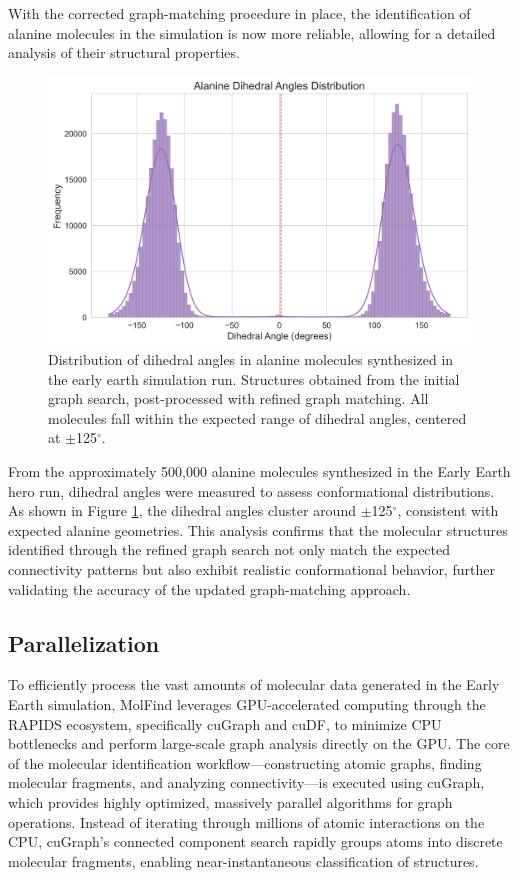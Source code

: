 With the corrected graph-matching procedure in place, the identification of alanine molecules in the simulation is now more reliable, allowing for a detailed analysis of their structural properties. 

\begin{figure}[!ht]
    \centering
    \includegraphics[width=1\linewidth]{Images/alanine_dihedral/dihedral_angles_distribution.png}
    \caption[Distribution of synthesized alanine dihedral angles]{Distribution of dihedral angles in alanine molecules synthesized in the early earth simulation run. Structures obtained from the initial graph search, post-processed with refined graph matching. All molecules fall within the expected range of dihedral angles, centered at $\pm$125$^\circ$.}
    \label{fig:ala_dihedral}
\end{figure}

From the approximately 500,000 alanine molecules synthesized in the Early Earth hero run, dihedral angles were measured to assess conformational distributions. As shown in Figure \ref{fig:ala_dihedral}, the dihedral angles cluster around $\pm$125$^\circ$, consistent with expected alanine geometries. This analysis confirms that the molecular structures identified through the refined graph search not only match the expected connectivity patterns but also exhibit realistic conformational behavior, further validating the accuracy of the updated graph-matching approach.

\subsection{Parallelization}
\label{subsec:molfind_parallelization}

To efficiently process the vast amounts of molecular data generated in the Early Earth simulation, MolFind leverages GPU-accelerated computing through the RAPIDS ecosystem, specifically cuGraph and cuDF, to minimize CPU bottlenecks and perform large-scale graph analysis directly on the GPU. The core of the molecular identification workflow—constructing atomic graphs, finding molecular fragments, and analyzing connectivity—is executed using cuGraph, which provides highly optimized, massively parallel algorithms for graph operations. Instead of iterating through millions of atomic interactions on the CPU, cuGraph’s connected component search rapidly groups atoms into discrete molecular fragments, enabling near-instantaneous classification of structures.

